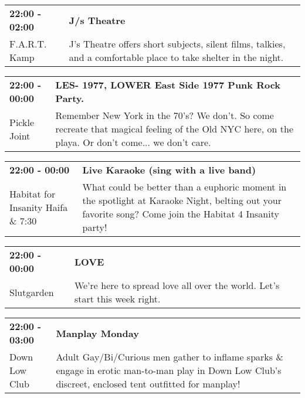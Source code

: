 \begin{tabular}{ p{1in} p{2.2in} }
    \textbf{22:00 - 02:00} & \textbf{J/s Theatre} \\
    F.A.R.T. Kamp \newline  & J's Theatre offers short subjects, silent films, talkies, and a comfortable place to take shelter in the night. \\
    \hline 
\end{tabular}
    
\begin{tabular}{ p{1in} p{2.2in} }
    \textbf{22:00 - 00:00} & \textbf{LES- 1977, LOWER East Side 1977 Punk Rock Party.  } \\
    Pickle Joint \newline  & Remember New York in the 70's? We don't. So come recreate that magical feeling of the Old NYC here, on the playa. Or don't come... we don't care. \\
    \hline 
\end{tabular}
    
\begin{tabular}{ p{1in} p{2.2in} }
    \textbf{22:00 - 00:00} & \textbf{Live Karaoke (sing with a live band)} \\
    Habitat for Insanity \newline Haifa \& 7:30 & What could be better than a euphoric moment in the spotlight at Karaoke Night, belting out your favorite song? Come join the Habitat 4 Insanity party! \\
    \hline 
\end{tabular}
    
\begin{tabular}{ p{1in} p{2.2in} }
    \textbf{22:00 - 00:00} & \textbf{LOVE} \\
    Slutgarden \newline  & We're here to spread love all over the world. Let's start this week right. \\
    \hline 
\end{tabular}
    
\begin{tabular}{ p{1in} p{2.2in} }
    \textbf{22:00 - 03:00} & \textbf{Manplay Monday} \\
    Down Low Club \newline  & Adult Gay/Bi/Curious men gather to inflame sparks \& engage in erotic man-to-man play in Down Low Club's discreet, enclosed tent outfitted for manplay! \\
    \hline 
\end{tabular}
    
